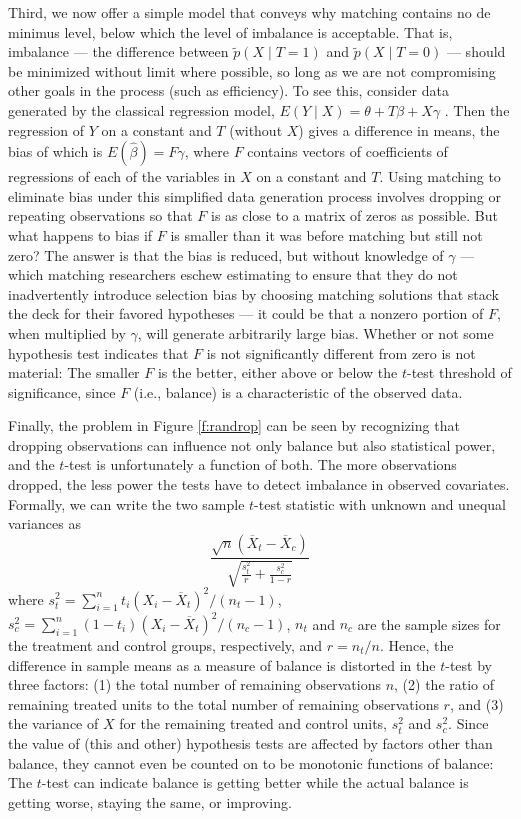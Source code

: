 \documentclass[11pt,titlepage]{article}
\begin{document}
Third, we now offer a simple model that conveys why matching contains
no de minimus level, below which the level of imbalance is acceptable.
That is, imbalance --- the difference between $\tilde p(X\mid T=1)$
and $\tilde p(X\mid T=0)$ --- should be minimized without limit where
possible, so long as we are not compromising other goals in the
process (such as efficiency).  To see this, consider data generated by
the classical regression model, $E(Y\mid X)= \theta + T\beta +
X\gamma$ \citep{Goldberger91}.  Then the regression of $Y$ on a
constant and $T$ (without $X$) gives a difference in means, the bias
of which is $E(\hat\beta) = F\gamma$, where $F$ contains vectors of
coefficients of regressions of each of the variables in $X$ on a
constant and $T$.  Using matching to eliminate bias under this
simplified data generation process involves dropping or repeating
observations so that $F$ is as close to a matrix of zeros as possible.
But what happens to bias if $F$ is smaller than it was before matching
but still not zero?  The answer is that the bias is reduced, but
without knowledge of $\gamma$ --- which matching researchers eschew
estimating to ensure that they do not inadvertently introduce
selection bias by choosing matching solutions that stack the deck for
their favored hypotheses --- it could be that a nonzero portion of
$F$, when multiplied by $\gamma$, will generate arbitrarily large
bias.  Whether or not some hypothesis test indicates that $F$ is not
significantly different from zero is not material: The smaller $F$ is
the better, either above or below the $t$-test threshold of
significance, since $F$ (i.e., balance) is a characteristic of the
observed data.

Finally, the problem in Figure \ref{f:randrop} can be seen by
recognizing that dropping observations can influence not only balance
but also statistical power, and the $t$-test is unfortunately a
function of both.  The more observations dropped, the less power the
tests have to detect imbalance in observed covariates.  Formally, we
can write the two sample $t$-test statistic with unknown and
unequal variances as
\begin{equation}
  \label{ttest} \frac{\sqrt{n}(\overline{X}_t-\overline{X}_c)}
               {\sqrt{\frac{s^2_t}{r} + \frac{s^2_c}{1-r}}}
\end{equation}
where $s^2_t=\sum_{i=1}^n t_i(X_i - \overline{X}_t)^2/(n_t-1)$,
$s^2_c=\sum_{i=1}^n (1-t_i)(X_i - \overline{X}_t)^2/(n_c-1)$, $n_t$
and $n_c$ are the sample sizes for the treatment and control groups,
respectively, and $r=n_t/n$.  Hence, the difference in sample means as
a measure of balance is distorted in the $t$-test by three factors:
(1) the total number of remaining observations $n$, (2) the ratio of
remaining treated units to the total number of remaining observations
$r$, and (3) the variance of $X$ for the remaining treated and control
units, $s_t^2$ and $s_c^2$.  Since the value of (this and other)
hypothesis tests are affected by factors other than balance, they
cannot even be counted on to be monotonic functions of balance: The
$t$-test can indicate balance is getting better while the actual
balance is getting worse, staying the same, or improving.
\end{document}
